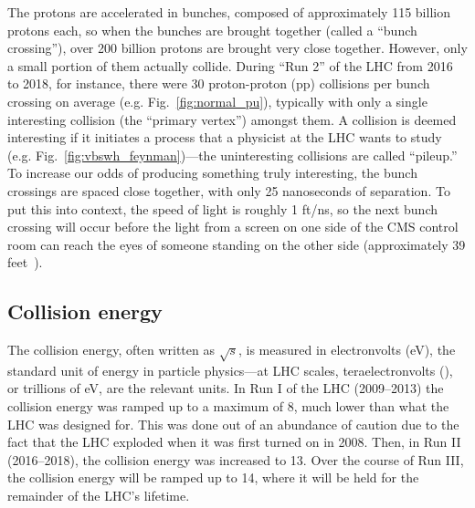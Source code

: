 The protons are accelerated in bunches, composed of approximately 115 billion protons each, so when the bunches are brought together (called a ``bunch crossing''), over 200 billion protons are brought very close together.
However, only a small portion of them actually collide. 
During ``Run 2'' of the LHC from 2016 to 2018, for instance, there were 30 proton-proton (pp) collisions per bunch crossing on average (e.g. Fig.~\ref{fig:normal_pu}), typically with only a single interesting collision (the ``primary vertex'') amongst them. 
A collision is deemed interesting if it initiates a process that a physicist at the LHC wants to study (e.g. Fig.~\ref{fig:vbswh_feynman})---the uninteresting collisions are called ``pileup.'' 
To increase our odds of producing something truly interesting, the bunch crossings are spaced close together, with only 25 nanoseconds of separation. 
To put this into context, the speed of light is roughly 1 ft/ns, so the next bunch crossing will occur before the light from a screen on one side of the CMS control room can reach the eyes of someone standing on the other side (approximately 39 feet~\cite{CMSP5Layout}).

\subsection{Collision energy}
The collision energy, often written as $\sqrt{s}$, is measured in electronvolts (eV), the standard unit of energy in particle physics---at LHC scales, teraelectronvolts (\TeVns), or trillions of eV, are the relevant units. 
In Run I of the LHC (2009--2013) the collision energy was ramped up to a maximum of 8\TeV, much lower than what the LHC was designed for. %
This was done out of an abundance of caution due to the fact that the LHC exploded when it was first turned on in 2008. %
Then, in Run II (2016--2018), the collision energy was increased to 13\TeV. 
Over the course of Run III, the collision energy will be ramped up to 14\TeV, where it will be held for the remainder of the LHC's lifetime. 

